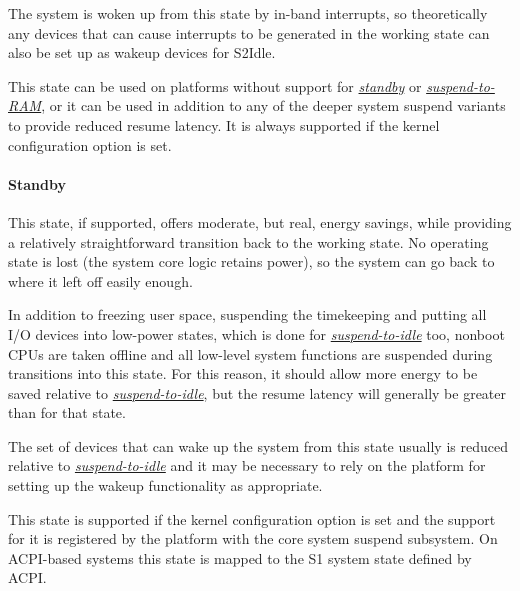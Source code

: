 \documentclass[a4paper,8pt,english]{sphinxmanual}
\begin{document}
The system is woken up from this state by in-band interrupts, so theoretically
any devices that can cause interrupts to be generated in the working state can
also be set up as wakeup devices for S2Idle.

This state can be used on platforms without support for {\hyperref[admin\string-guide/pm/sleep\string-states:standby]{\emph{standby}}}
or {\hyperref[admin\string-guide/pm/sleep\string-states:s2ram]{\emph{suspend-to-RAM}}}, or it can be used in addition to any of the
deeper system suspend variants to provide reduced resume latency.  It is always
supported if the  kernel configuration option is set.


\paragraph{Standby}
\label{admin-guide/pm/sleep-states:standby}\label{admin-guide/pm/sleep-states:id1}
This state, if supported, offers moderate, but real, energy savings, while
providing a relatively straightforward transition back to the working state.  No
operating state is lost (the system core logic retains power), so the system can
go back to where it left off easily enough.

In addition to freezing user space, suspending the timekeeping and putting all
I/O devices into low-power states, which is done for {\hyperref[admin\string-guide/pm/sleep\string-states:s2idle]{\emph{suspend-to-idle}}} too, nonboot CPUs are taken offline and all low-level system functions
are suspended during transitions into this state.  For this reason, it should
allow more energy to be saved relative to {\hyperref[admin\string-guide/pm/sleep\string-states:s2idle]{\emph{suspend-to-idle}}}, but
the resume latency will generally be greater than for that state.

The set of devices that can wake up the system from this state usually is
reduced relative to {\hyperref[admin\string-guide/pm/sleep\string-states:s2idle]{\emph{suspend-to-idle}}} and it may be necessary to
rely on the platform for setting up the wakeup functionality as appropriate.

This state is supported if the  kernel configuration
option is set and the support for it is registered by the platform with the
core system suspend subsystem.  On ACPI-based systems this state is mapped to
the S1 system state defined by ACPI.
\end{document}
